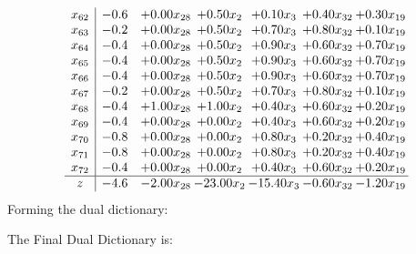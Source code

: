 \documentclass[8pt]{article}
\begin{document}
\[\begin{array}{c| c c@{\hskip 2pt} c@{\hskip 2pt} c@{\hskip 2pt} c@{\hskip 2pt} c@{\hskip 2pt} }
 x_{62}   &  -0.6 & +  0.00 x_{28} & +  0.50 x_{2} & +  0.10 x_{3} & +  0.40 x_{32} & +  0.30 x_{19}\\
 x_{63}   &  -0.2 & +  0.00 x_{28} & +  0.50 x_{2} & +  0.70 x_{3} & +  0.80 x_{32} & +  0.10 x_{19}\\
 x_{64}   &  -0.4 & +  0.00 x_{28} & +  0.50 x_{2} & +  0.90 x_{3} & +  0.60 x_{32} & +  0.70 x_{19}\\
 x_{65}   &  -0.4 & +  0.00 x_{28} & +  0.50 x_{2} & +  0.90 x_{3} & +  0.60 x_{32} & +  0.70 x_{19}\\
 x_{66}   &  -0.4 & +  0.00 x_{28} & +  0.50 x_{2} & +  0.90 x_{3} & +  0.60 x_{32} & +  0.70 x_{19}\\
 x_{67}   &  -0.2 & +  0.00 x_{28} & +  0.50 x_{2} & +  0.70 x_{3} & +  0.80 x_{32} & +  0.10 x_{19}\\
 x_{68}   &  -0.4 & +  1.00 x_{28} & +  1.00 x_{2} & +  0.40 x_{3} & +  0.60 x_{32} & +  0.20 x_{19}\\
 x_{69}   &  -0.4 & +  0.00 x_{28} & +  0.00 x_{2} & +  0.40 x_{3} & +  0.60 x_{32} & +  0.20 x_{19}\\
 x_{70}   &  -0.8 & +  0.00 x_{28} & +  0.00 x_{2} & +  0.80 x_{3} & +  0.20 x_{32} & +  0.40 x_{19}\\
 x_{71}   &  -0.8 & +  0.00 x_{28} & +  0.00 x_{2} & +  0.80 x_{3} & +  0.20 x_{32} & +  0.40 x_{19}\\
 x_{72}   &  -0.4 & +  0.00 x_{28} & +  0.00 x_{2} & +  0.40 x_{3} & +  0.60 x_{32} & +  0.20 x_{19}\\
\hline
z    &  -4.6 & -2.00 x_{28} & -23.00 x_{2} & -15.40 x_{3} & -0.60 x_{32} & -1.20 x_{19}\\
\end{array}\]
Forming the dual dictionary:

The Final Dual Dictionary is: 
\end{document}
